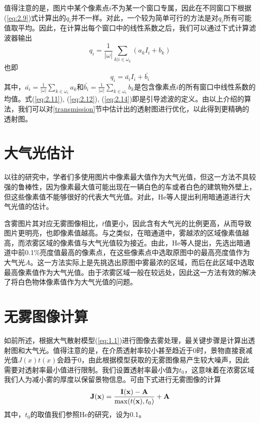 \documentclass[a4paper, 12pt, oneside]{report}
\begin{document}
{值得注意的是，图片中某个像素点$i$不为某一个窗口专属，因此在不同窗口下根据(\ref{eq:2.9})式计算出的$q_i$并不一样。对此，一个较为简单可行的方法是对$q_i$所有可能值取平均。因此，在计算出每个窗口中的线性系数之后，我们可以通过下式计算滤波器输出
\begin{equation} \label{eq:2.13}
q_i = \frac{1}{|\omega|}\sum_{k|i\in \omega_k}(a_k I_i + b_k)
\end{equation}
也即
\begin{equation} \label{eq:2.14}
q_i = \bar{a_i}I_i + \bar{b_i}
\end{equation}
其中，$\bar{a_i} = \frac{1}{|\omega|}\sum_{k\in \omega_i}a_k$和$\bar{b_i} = \frac{1}{|\omega|}\sum_{k\in \omega_i}b_k$是包含像素点$i$的所有窗口中线性系数的均值。式(\ref{eq:2.11}), (\ref{eq:2.12}), (\ref{eq:2.14})即是引导滤波的定义。由以上介绍的算法，我们可以对\ref{transmission}节中估计出的透射图进行优化，以此得到更精确的透射图。

\section{大气光估计\quad} \label{airlight}
以往的研究中，学者们多使用图片中像素最大值作为大气光值，但这一方法不具较强的鲁棒性，因为像素最大值可能出现在一辆白色的车或者白色的建筑物外壁上，但这些像素值不能够很好的代表大气光值。对此，He等人提出利用暗通道进行大气光值的估计。

含雾图片其对应无雾图像相比，$t$值更小，因此含有大气光的比例更高，从而导致图片更明亮，也即像素值越高。与之类似，在暗通道中，雾越浓的区域像素值越高，而浓雾区域的像素值与大气光值较为接近。由此，He等人提出，先选出暗通道中前0.1\%亮度值最高的像素点，在这些像素点中选取原图中的最高亮度值作为大气光$A$。这一方法实际上是先挑选出原图中雾最浓的区域，而后在此区域中选取最高像素值作为大气光值。由于浓雾区域一般在较远处，因此这一方法有效的解决了将白色物体像素值作为大气光值的问题。

\section{无雾图像计算\quad}
如前所述，根据大气散射模型(\ref{eq:1.1})进行图像去雾处理，最关键步骤是计算出透射图和大气光。值得注意的是，在介质透射率较小甚至趋近于0时，景物直接衰减光值$J(x)t(x)$会趋于0，由此根据模型获取的无雾图像易产生较大噪声，因此需要对透射率最小值进行限制。我们设置透射率最小值为$t_0$，这意味着在浓雾区域我们人为减小雾的厚度以保留景物信息。可由下式进行无雾图像的计算
\begin{equation} \label{eq:2.15}
{\bf J(x)} = \frac{\bf I(x) - A}{\max(t({\bf x}), t_0)} + {\bf A}
\end{equation}
其中，$t_0$的取值我们参照He的研究，设为0.1。

}
\end{document}
